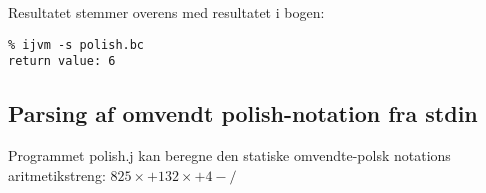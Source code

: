 \documentclass[12pt,a4paper]{article}
\begin{document}
Resultatet stemmer overens med resultatet i bogen:
\lstset{language=sh}
\begin{lstlisting}
% ijvm -s polish.bc
return value: 6
\end{lstlisting}

\subsection{Parsing af omvendt polish-notation fra stdin}
Programmet polish.j kan beregne den statiske omvendte-polsk notations aritmetikstreng:
$825\times+132\times+4-/$
\end{document}
